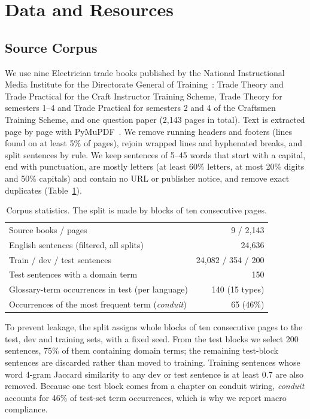 \documentclass[conference]{IEEEtran}
\begin{document}
\section{Data and Resources}
\label{sec:data}

\subsection{Source Corpus}
We use nine Electrician trade books published by the National Instructional Media Institute for the Directorate General of Training~\cite{nimi_electrician}: Trade Theory and Trade Practical for the Craft Instructor Training Scheme, Trade Theory for semesters 1--4 and Trade Practical for semesters 2 and 4 of the Craftsmen Training Scheme, and one question paper (2,143 pages in total). Text is extracted page by page with PyMuPDF~\cite{pymupdf}. We remove running headers and footers (lines found on at least 5\% of pages), rejoin wrapped lines and hyphenated breaks, and split sentences by rule. We keep sentences of 5--45 words that start with a capital, end with punctuation, are mostly letters (at least 60\% letters, at most 20\% digits and 50\% capitals) and contain no URL or publisher notice, and remove exact duplicates (Table~\ref{tab:corpus}).

\begin{table}[t]
\caption{Corpus statistics. The split is made by blocks of ten consecutive pages.}
\label{tab:corpus}
\centering
\footnotesize
\begin{tabular}{@{}lr@{}}
\toprule
Source books / pages & 9 / 2,143 \\
English sentences (filtered, all splits) & 24,636 \\
Train / dev / test sentences & 24,082 / 354 / 200 \\
Test sentences with a domain term & 150 \\
Glossary-term occurrences in test (per language) & 140 (15 types) \\
Occurrences of the most frequent term (\emph{conduit}) & 65 (46\%) \\
\bottomrule
\end{tabular}
\end{table}

To prevent leakage, the split assigns whole blocks of ten consecutive pages to the test, dev and training sets, with a fixed seed. From the test blocks we select 200 sentences, 75\% of them containing domain terms; the remaining test-block sentences are discarded rather than moved to training. Training sentences whose word 4-gram Jaccard similarity to any dev or test sentence is at least 0.7 are also removed. Because one test block comes from a chapter on conduit wiring, \emph{conduit} accounts for 46\% of test-set term occurrences, which is why we report macro compliance.
\end{document}
